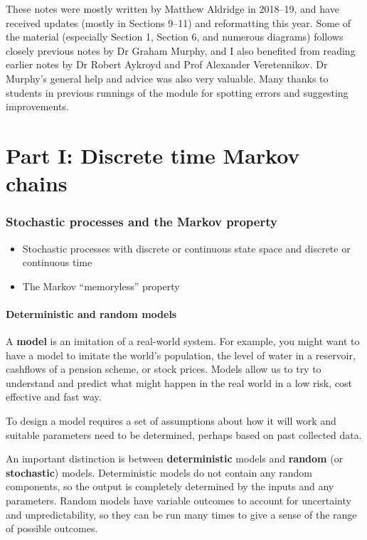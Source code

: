 \documentclass[
  a4paper,
]{article}
\providecommand{\tightlist}{%
  \setlength{\itemsep}{0pt}\setlength{\parskip}{0pt}}
\theoremstyle{definition}
\theoremstyle{definition}
\theoremstyle{definition}
\theoremstyle{remark}
\begin{document}
These notes were mostly written by Matthew Aldridge in 2018--19, and have received updates (mostly in Sections 9--11) and reformatting this year. Some of the material (especially Section 1, Section 6, and numerous diagrams) follows closely previous notes by Dr Graham Murphy, and I also benefited from reading earlier notes by Dr Robert Aykroyd and Prof Alexander Veretennikov. Dr Murphy's general help and advice was also very valuable. Many thanks to students in previous runnings of the module for spotting errors and suggesting improvements.

\hypertarget{part-part-i-discrete-time-markov-chains}{%
\part*{Part I: Discrete time Markov chains}\label{part-part-i-discrete-time-markov-chains}}

\hypertarget{S01-stochastic-processes}{%
\section{Stochastic processes and the Markov property}\label{S01-stochastic-processes}}

\begin{itemize}
\tightlist
\item
  Stochastic processes with discrete or continuous state space and discrete or continuous time
\item
  The Markov ``memoryless'' property
\end{itemize}

\hypertarget{models}{%
\subsection{Deterministic and random models}\label{models}}

A \textbf{model} is an imitation of a real-world system. For example, you might want to have a model to imitate the world's population, the level of water in a reservoir, cashflows of a pension scheme, or stock prices. Models allow us to try to understand and predict what might happen in the real world in a low risk, cost effective and fast way.

To design a model requires a set of assumptions about how it will work and suitable parameters need to be determined, perhaps based on past collected data.

An important distinction is between \textbf{deterministic} models and \textbf{random} (or \textbf{stochastic}) models. Deterministic models do not contain any random components, so the output is completely determined by the inputs and any parameters. Random models have variable outcomes to account for uncertainty and unpredictability, so they can be run many times to give a sense of the range of possible outcomes.
\end{document}
